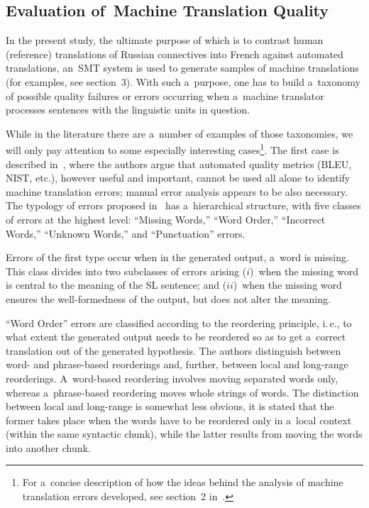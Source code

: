 \begin{multicols}{2}
\section{Evaluation of~Machine Translation Quality}

\noindent
  In the present study, the ultimate purpose of which is to contrast human (reference) 
translations of Russian connectives into French against automated translations,  
an~SMT system is used to generate samples of machine translations (for 
examples, see section~3). With such a~purpose, one has to build a~taxonomy of 
possible quality failures or errors occurring when a~machine translator processes 
sentences with the linguistic units in question.

  
  While in the literature there are a~number of examples of those taxonomies, we 
will only pay attention to some especially interesting cases\footnote{For a~concise 
description of how the ideas behind the analysis of machine translation errors developed, see section~2 
in~\cite{14-n}.}. The first case is described in~\cite{13-n}, where the authors argue 
that automated quality metrics (BLEU, NIST, etc.), however useful and important, 
cannot be used all alone to identify machine translation errors; manual error 
analysis appears to be also necessary. The typology of errors proposed  
in~\cite{13-n} has a~hierarchical structure, with five classes of errors at the highest 
level: ``Missing Words,'' ``Word Order,'' ``Incorrect Words,'' ``Unknown Words,'' 
and ``Punctuation'' errors.
  
  Errors of the first type occur when in the generated output, a~word is missing. 
This class divides into two subclasses of errors arising ($i$)~when the missing word 
is central to the meaning of the SL sentence; and ($ii$)~when the missing word 
ensures the well-formedness of the output, but does not alter the meaning.
  
  ``Word Order'' errors are classified according to the reordering principle, i.\,e., to 
what extent the gen\-er\-ated output needs to be reordered so as to get a~correct 
translation out of the generated hypothesis. The authors distinguish between word- 
and phrase-based reorderings and, further, between local and long-range 
reorderings. A~word-based reordering involves moving separated words only, 
whereas a~phrase-based reordering moves whole strings of words. The distinction 
between local and long-range is somewhat less obvious, it is stated that the former 
takes place when the words have to be reordered only in a~local context (within the 
same syntactic chunk), while the latter results from moving the words into another 
chunk.
  

\end{multicols}
